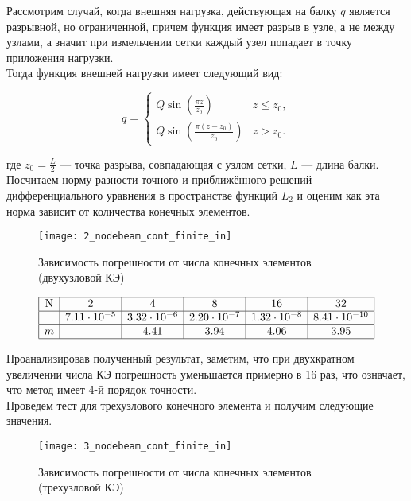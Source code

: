 \documentclass[12pt,a4paper]{article}
\begin{document}
Рассмотрим случай, когда внешняя нагрузка, действующая на балку $q$ является разрывной, но ограниченной, причем функция имеет разрыв в узле, а не между узлами, а значит при измельчении сетки каждый узел попадает в точку приложения нагрузки. \\

 Тогда функция внешней нагрузки имеет следующий вид:

\begin{equation}
q = 
 \begin{cases}
	Q \sin \left(\frac{\pi  z}{z_{0}}\right) & z \leq z_{0},\\
    Q \sin \left(\frac{\pi  (z-z_{0})}{z_{0}}\right) & z > z_{0}.
 \end{cases}
\end{equation}

где $z_{0}=\frac{L}{2}$ --- точка разрыва, совпадающая с узлом сетки, $L$ --- длина балки. \\

Посчитаем норму разности точного и приближённого решений дифференциального уравнения в пространстве функций $L_{2}$  и оценим как эта норма зависит от количества конечных элементов.\\

\begin{figure}[H]
	\centering
	\texttt{[image: 2\_nodebeam\_cont\_finite\_in]}
	\caption{Зависимость погрешности от числа конечных элементов (двухузловой КЭ)}
	\label{fig:2_nodebeam_cont_finite_in}
\end{figure}
\[
\begin{array}{|c|c|c|c|c|c|}
	\hline
	\text{N} & 2 & 4 & 8 & 16 & 32 \\ \hline
\Delta  & 7.11 \cdot 10^{-5} & 3.32 \cdot 10^{-6} & 2.20 \cdot 10^{-7} & 1.32 \cdot 10^{-8} & 8.41 \cdot 10^{-10}\\ \hline
m  &  & 4.41 & 3.94 & 4.06 & 3.95 \\ 
	\hline
	\end{array}
	\]

Проанализировав полученный результат, заметим, что при двухкратном увеличении числа КЭ погрешность уменьшается примерно в 16 раз, что означает, что метод имеет 4-й порядок точности.\\

 Проведем тест для трехузлового конечного элемента и получим следующие значения. 
\begin{figure}[H]
		\centering
		\texttt{[image: 3\_nodebeam\_cont\_finite\_in]}
		\caption{Зависимость погрешности от числа конечных элементов (трехузловой КЭ)}
		\label{fig:3_nodebeam_cont_finite_in}
	\end{figure}
\end{document}
